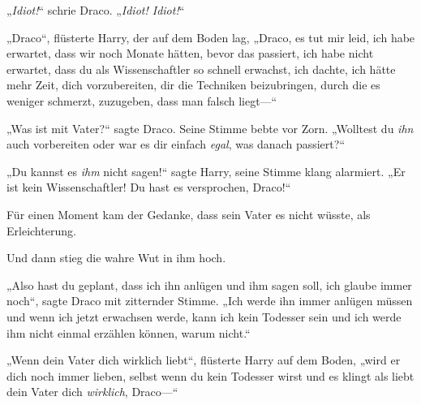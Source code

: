 „\emph{Idiot!}“ schrie Draco. „\emph{Idiot! Idiot!}“

„Draco“, flüsterte Harry, der auf dem Boden lag, „Draco, es tut mir leid, ich habe erwartet, dass wir noch Monate hätten, bevor das passiert, ich habe nicht erwartet, dass du als Wissenschaftler so schnell erwachst, ich dachte, ich hätte mehr Zeit, dich vorzubereiten, dir die Techniken beizubringen, durch die es weniger schmerzt, zuzugeben, dass man falsch liegt—“

„Was ist mit Vater?“ sagte Draco. Seine Stimme bebte vor Zorn. „Wolltest du \emph{ihn} auch vorbereiten oder war es dir einfach \emph{egal}, was danach passiert?“

„Du kannst es \emph{ihm} nicht sagen!“ sagte Harry, seine Stimme klang alarmiert. „Er ist kein Wissenschaftler! Du hast es versprochen, Draco!“

Für einen Moment kam der Gedanke, dass sein Vater es nicht wüsste, als Erleichterung.

Und dann stieg die wahre Wut in ihm hoch.

„Also hast du geplant, dass ich ihn anlügen und ihm sagen soll, ich glaube immer noch“, sagte Draco mit zitternder Stimme. „Ich werde ihn immer anlügen müssen und wenn ich jetzt erwachsen werde, kann ich kein Todesser sein und ich werde ihm nicht einmal erzählen können, warum nicht.“

„Wenn dein Vater dich wirklich liebt“, flüsterte Harry auf dem Boden, „wird er dich noch immer lieben, selbst wenn du kein Todesser wirst und es klingt als liebt dein Vater dich \emph{wirklich}, Draco—“

